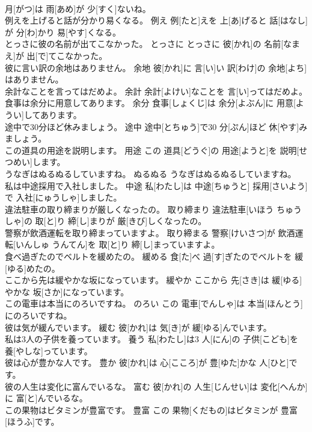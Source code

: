 \documentclass[8pt]{extreport}
\begin{document}
\begin{CJK}{UTF8}{min}
\\	月[がつ]は 雨[あめ]が 少[すく]ないね。	
\\	例えを上げると話が分かり易くなる。	例え	例[たと]えを 上[あ]げると 話[はなし]が 分[わ]かり 易[やす]くなる。	
\\	とっさに彼の名前が出てこなかった。	とっさに	とっさに 彼[かれ]の 名前[なまえ]が 出[で]てこなかった。	
\\	彼に言い訳の余地はありません。	余地	彼[かれ]に 言[い]い 訳[わけ]の 余地[よち]はありません。	
\\	余計なことを言ってはだめよ。	余計	余計[よけい]なことを 言[い]ってはだめよ。	
\\	食事は余分に用意してあります。	余分	食事[しょくじ]は 余分[よぶん]に 用意[ようい]してあります。	
\\	途中で30分ほど休みましょう。	途中	途中[とちゅう]で30 分[ぷん]ほど 休[やす]みましょう。	
\\	この道具の用途を説明します。	用途	この 道具[どうぐ]の 用途[ようと]を 説明[せつめい]します。	
\\	うなぎはぬるぬるしていますね。	ぬるぬる	うなぎはぬるぬるしていますね。	
\\	私は中途採用で入社しました。	中途	私[わたし]は 中途[ちゅうと] 採用[さいよう]で 入社[にゅうしゃ]しました。	
\\	違法駐車の取り締まりが厳しくなったの。	取り締まり	違法駐車[いほう ちゅうしゃ]の 取[と]り 締[し]まりが 厳[きび]しくなったの。	
\\	警察が飲酒運転を取り締まっていますよ。	取り締まる	警察[けいさつ]が 飲酒運転[いんしゅ うんてん]を 取[と]り 締[し]まっていますよ。	
\\	食べ過ぎたのでベルトを緩めたの。	緩める	食[た]べ 過[す]ぎたのでベルトを 緩[ゆる]めたの。	
\\	ここから先は緩やかな坂になっています。	緩やか	ここから 先[さき]は 緩[ゆる]やかな 坂[さか]になっています。	
\\	この電車は本当にのろいですね。	のろい	この 電車[でんしゃ]は 本当[ほんとう]にのろいですね。	
\\	彼は気が緩んでいます。	緩む	彼[かれ]は 気[き]が 緩[ゆる]んでいます。	
\\	私は3人の子供を養っています。	養う	私[わたし]は3 人[にん]の 子供[こども]を 養[やしな]っています。	
\\	彼は心が豊かな人です。	豊か	彼[かれ]は 心[こころ]が 豊[ゆた]かな 人[ひと]です。	
\\	彼の人生は変化に富んでいるな。	富む	彼[かれ]の 人生[じんせい]は 変化[へんか]に 富[と]んでいるな。	
\\	この果物はビタミンが豊富です。	豊富	この 果物[くだもの]はビタミンが 豊富[ほうふ]です。	

\end{CJK}
\end{document}
